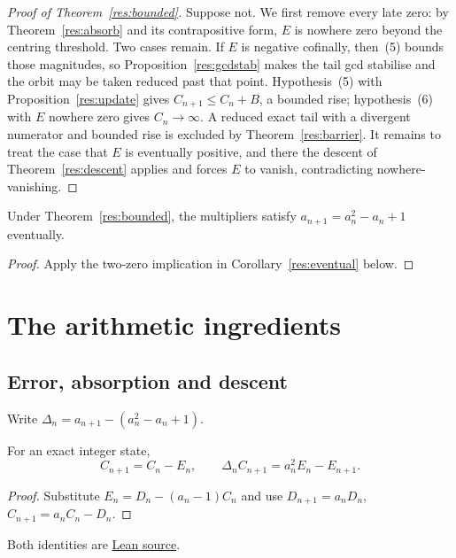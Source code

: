 \documentclass[11pt]{article}
\begin{document}
\begin{proof}[Proof of Theorem~\ref{res:bounded}]
Suppose not.  We first remove every late zero: by Theorem~\ref{res:absorb} and
its contrapositive form, $E$ is nowhere zero beyond the centring threshold.
Two cases remain.  If $E$ is negative cofinally,
then~(5) bounds those magnitudes, so Proposition~\ref{res:gcdstab} makes the
tail gcd stabilise and the orbit may be taken reduced past that point.
Hypothesis~(5) with
Proposition~\ref{res:update} gives $C_{n+1}\le C_n+B$, a bounded rise;
hypothesis~(6) with $E$ nowhere zero gives $C_n\to\infty$.  A reduced exact
tail with a divergent numerator and bounded rise is excluded by
Theorem~\ref{res:barrier}.  It remains to treat the case that $E$ is eventually
positive, and there the descent
of Theorem~\ref{res:descent} applies and forces $E$ to vanish, contradicting
nowhere-vanishing.
\end{proof}

\begin{corollary}\label{res:cor}
Under Theorem~\ref{res:bounded}, the multipliers satisfy
$a_{n+1}=a_n^2-a_n+1$ eventually.
\end{corollary}
\begin{proof}
Apply the two-zero implication in Corollary~\ref{res:eventual} below.
\end{proof}

\section{The arithmetic ingredients}\label{sec:state}
\subsection{Error, absorption and descent}\label{sec:defect}\label{sec:descent}
Write $\Delta_n=a_{n+1}-(a_n^2-a_n+1)$.

\begin{proposition}\label{res:update}\label{res:defect}
For an exact integer state,
\[
 C_{n+1}=C_n-E_n,\qquad
 \Delta_n C_{n+1}=a_n^2E_n-E_{n+1}.
\]
\end{proposition}
\begin{proof}
Substitute $E_n=D_n-(a_n-1)C_n$ and use
$D_{n+1}=a_nD_n$, $C_{n+1}=a_nC_n-D_n$.
\end{proof}

\noindent Both identities are
\href{https://github.com/wcook04/plectis-erdos/blob/f36a98bf3d3e6f65f1074e3b800e3293d5b8a51a/ErdosProblems/Erdos243/PaperCompleteR7/Arithmetic.lean#L21}{Lean source}.
\end{document}
